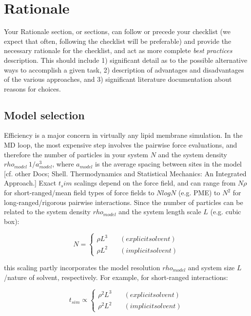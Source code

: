 \documentclass[9pt,bestpractices]{livecoms}
\begin{document}
\section{Rationale}

Your Rationale section, or sections, can follow or precede your checklist (we expect that often, following the checklist will be preferable) and provide the necessary rationale for the checklist, and act as more complete \emph{best practices} description.
This should include 1) significant detail as to the possible alternative ways to accomplish a given task, 2) description of advantages and disadvantages of the various approaches, and 3) significant literature documentation about reasons for choices.

\subsection{Model selection}
Efficiency is a major concern in virtually any lipid membrane simulation.
In the MD loop, the most expensive step involves the pairwise force evaluations, and therefore the number of particles in your system $N$ and the system density $rho_{model} ~ 1/a_{model}^3$, where $a_{model}$ is the average spacing between sites in the model [cf. other Docs; Shell. Thermodynamics and Statistical Mechanics: An Integrated Approach.]
Exact $t_sim$ scalings depend on the force field, and can range from $N \rho$ for short-ranged/mean field types of force fields to $NlogN$ (e.g. PME) to $N^2$ for long-ranged/rigorous pairwise interactions.
Since the number of particles can be related to the system density $rho_{model}$ and the system length scale $L$ (e.g. cubic box):

\begin{equation}
	\label{e:partition}
	N = \left\{
        		\begin{array}{ll}
            		\rho L^3 & \quad (explicit solvent) \\
            		\rho L^2 & \quad (implicit solvent)
        		\end{array}
    	\right.
\end{equation}

this scaling partly incorporates the model resolution $rho_{model}$ and system size $L$/nature of solvent, respectively.
For example, for short-ranged interactions:

\begin{equation}
	\label{e:partition}
	t_{sim} \propto \left\{
        		\begin{array}{ll}
            		\rho^2 L^3 & \quad (explicit solvent) \\
            		\rho^2 L^2 & \quad (implicit solvent)
        		\end{array}
    	\right.
\end{equation}
\end{document}
